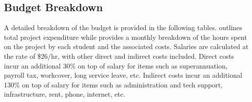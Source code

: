 \documentclass[main.tex]{subfiles}
\begin{document}
\begin{appendices}
%
%

\chapter{Budget Breakdown}
A detailed breakdown of the budget is provided in the following tables.  outlines total project expenditure while  provides a monthly breakdown of the hours spent on the project by each student and the associated costs. Salaries are calculated at the rate of \$26/hr, with other direct and indirect costs included. Direct costs incur an additional 30\% on top of salary for items such as superannuation, payroll tax, workcover, long service leave, etc. Indirect costs incur an additional 130\% on top of salary for items such as administration and tech support, infrastructure, rent, phone, internet, etc.


\end{appendices}
\end{document}
